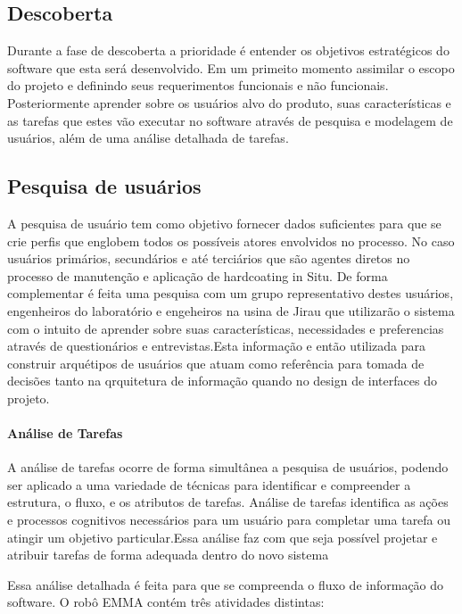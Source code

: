 \documentclass[12pt,a4paper]{article}
\begin{document}
\subsection{Descoberta}

Durante a fase de descoberta a prioridade é entender os objetivos estratégicos
do software que esta será desenvolvido. Em um primeito momento assimilar o
escopo do projeto e definindo seus requerimentos funcionais e não funcionais. 
Posteriormente aprender sobre os usuários alvo do produto, suas características
e as tarefas que estes vão executar no software através de pesquisa e
modelagem de usuários, além de uma análise detalhada de tarefas.

\subsection{Pesquisa de usuários}
A pesquisa de usuário tem como objetivo fornecer dados suficientes para que se
crie perfis que englobem todos os possíveis atores envolvidos no
processo. No caso usuários primários, secundários e até terciários que são
agentes diretos no processo de manutenção e aplicação de hardcoating in Situ.
De forma complementar é feita uma pesquisa com um grupo representativo
destes usuários, engenheiros do laboratório e engeheiros na usina de Jirau que
utilizarão o sistema com o intuito de aprender sobre suas características, necessidades
e preferencias através de questionários e entrevistas.Esta informação e então
utilizada para construir arquétipos de usuários que atuam como referência para
tomada de decisões tanto na qrquitetura de informação quando no design de
interfaces do projeto.


\paragraph{Análise de Tarefas}
A análise de tarefas ocorre de forma simultânea a pesquisa de usuários, podendo
ser aplicado a uma variedade de técnicas para identificar e compreender a estrutura, o fluxo, 
e os atributos de tarefas. Análise de tarefas identifica as ações e processos cognitivos 
necessários para um usuário para completar uma tarefa ou atingir um objetivo
particular.Essa análise faz com que seja possível projetar e atribuir tarefas de
forma adequada dentro do novo sistema

Essa análise detalhada é feita para que se compreenda o fluxo de informação do
software. O robô EMMA contém três atividades distintas:
\end{document}
